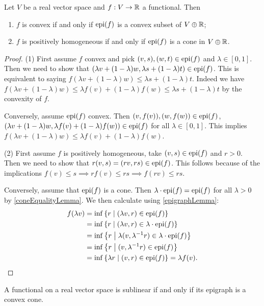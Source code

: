 \begin{proposition}
Let $V$ be a real vector space and $f: V\to \mathbb{R}$ a functional. Then
\begin{enumerate}
\item $f$ is convex \textup{if and only if} $\operatorname{epi}(f)$ is a convex subset of $V\oplus \mathbb{R}$;
\item $f$ is positively homogeneous \textup{if and only if} $\operatorname{epi}(f)$ is a cone in $V\oplus \mathbb{R}$.
\end{enumerate}
\end{proposition}
\begin{proof}
(1) First assume $f$ convex and pick $(v, s), (w,t)\in \operatorname{epi}(f)$ and $\lambda\in [0,1]$. Then we need to show that $(\lambda v + (1-\lambda)w, \lambda s + (1-\lambda)t) \in \operatorname{epi}(f)$. This is equivalent to saying $f(\lambda v + (1-\lambda)w) \leq \lambda s + (1-\lambda)t$. Indeed we have $f(\lambda v + (1-\lambda)w) \leq \lambda f(v) + (1-\lambda)f(w) \leq \lambda s + (1-\lambda)t$ by the convexity of $f$.

Conversely, assume $\operatorname{epi}(f)$ convex. Then $(v, f(v)), (w,f(w))\in \operatorname{epi}(f)$, $(\lambda v + (1-\lambda)w, \lambda f(v) + (1-\lambda)f(w)) \in \operatorname{epi}(f)$ for all $\lambda\in [0,1]$. This implies $f(\lambda v + (1-\lambda)w) \leq \lambda f(v) + (1-\lambda)f(w)$.

(2) First assume $f$ is positively homogeneous, take $(v,s)\in \operatorname{epi}(f)$ and $r>0$. Then we need to show that $r(v,s) = (rv,rs)\in \operatorname{epi}(f)$. This follows because of the implications $f(v)\leq s \implies rf(v) \leq rs \implies f(rv) \leq rs$.

Conversely, assume that $\operatorname{epi}(f)$ is a cone. Then $\lambda\cdot \operatorname{epi}(f) = \operatorname{epi}(f)$ for all $\lambda>0$ by \ref{coneEqualityLemma}. We then calculate using \ref{epigraphLemma}:
\begin{align*}
f(\lambda v) &= \inf\left\{ r \;\middle|\; (\lambda v,r)\in \operatorname{epi}(f) \right\} \\
&= \inf\left\{ r \;\middle|\; (\lambda v,r)\in \lambda\cdot\operatorname{epi}(f) \right\} \\
&= \inf\left\{ r \;\middle|\; \lambda(v,\lambda^{-1}r)\in \lambda\cdot\operatorname{epi}(f) \right\} \\
&= \inf\left\{ r \;\middle|\; (v,\lambda^{-1}r)\in \operatorname{epi}(f) \right\} \\
&= \inf\left\{ \lambda r \;\middle|\; (v,r)\in \operatorname{epi}(f) \right\} = \lambda f(v).
\end{align*} 
\end{proof}
\begin{corollary}
A functional on a real vector space is sublinear \textup{if and only if} its epigraph is a convex cone.
\end{corollary}

